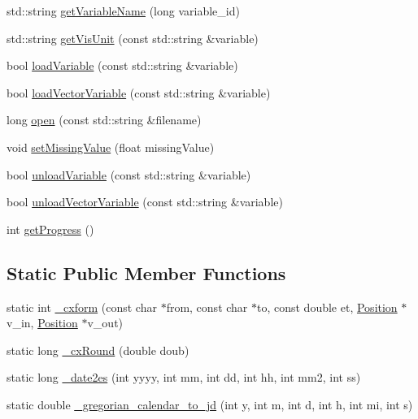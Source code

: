 \begin{DoxyCompactItemize}
\item 
std\-::string \hyperlink{classccmc_1_1_kameleon_a5119c010a235022bace10b7d6836a8a1}{get\-Variable\-Name} (long variable\-\_\-id)
\item 
std\-::string \hyperlink{classccmc_1_1_kameleon_a2d39ff33a302957d312122ff6127a4dc}{get\-Vis\-Unit} (const std\-::string \&variable)
\item 
bool \hyperlink{classccmc_1_1_kameleon_aab904337fec75f487e3082bc8eaec9f3}{load\-Variable} (const std\-::string \&variable)
\item 
bool \hyperlink{classccmc_1_1_kameleon_adeadf4c0fba486395e4bc2e73efa8002}{load\-Vector\-Variable} (const std\-::string \&variable)
\item 
long \hyperlink{classccmc_1_1_kameleon_ace633091252d6094098626ee6c295c61}{open} (const std\-::string \&filename)
\item 
void \hyperlink{classccmc_1_1_kameleon_a7caddec8830e6eec4ae9f4d971e43207}{set\-Missing\-Value} (float missing\-Value)
\item 
bool \hyperlink{classccmc_1_1_kameleon_a332b46cd76f5ddf5074e7380d84de352}{unload\-Variable} (const std\-::string \&variable)
\item 
bool \hyperlink{classccmc_1_1_kameleon_ade27fad11dc2a044fff40cee11376637}{unload\-Vector\-Variable} (const std\-::string \&variable)
\item 
int \hyperlink{classccmc_1_1_kameleon_ad2b623976f8ac7c69f35549669f01bc5}{get\-Progress} ()
\end{DoxyCompactItemize}
\subsection*{Static Public Member Functions}
\begin{DoxyCompactItemize}
\item 
static int \hyperlink{classccmc_1_1_kameleon_aaba6fb209c74149abf0568a0bcc39eb0}{\-\_\-cxform} (const char $\ast$from, const char $\ast$to, const double et, \hyperlink{structccmc_1_1_position}{Position} $\ast$v\-\_\-in, \hyperlink{structccmc_1_1_position}{Position} $\ast$v\-\_\-out)
\item 
static long \hyperlink{classccmc_1_1_kameleon_a1a62777efd8c88c07464d9bc39a02539}{\-\_\-cx\-Round} (double doub)
\item 
static long \hyperlink{classccmc_1_1_kameleon_addc547b1295af71ad1998cdbd5bcca4a}{\-\_\-date2es} (int yyyy, int mm, int dd, int hh, int mm2, int ss)
\item 
static double \hyperlink{classccmc_1_1_kameleon_ad9096349d4e123699dd9926595f5efcc}{\-\_\-gregorian\-\_\-calendar\-\_\-to\-\_\-jd} (int y, int m, int d, int h, int mi, int s)
\end{DoxyCompactItemize}
